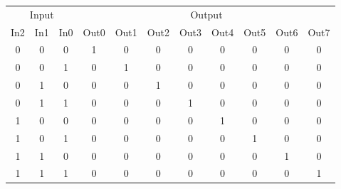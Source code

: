 \documentclass{standalone}
\begin{document}
	\begin{tabular}{ccc|cccccccc}
		\multicolumn{3}{c|}{Input} & \multicolumn{8}{c}{Output} \\
		In2 & In1 & In0 & Out0 & Out1 & Out2 & Out3 & Out4 & Out5 & Out6 & Out7 \\ \hline
		0 & 0 & 0 & 1 & 0 & 0 & 0 & 0 & 0 & 0 & 0 \\
		0 & 0 & 1 & 0 & 1 & 0 & 0 & 0 & 0 & 0 & 0 \\
		0 & 1 & 0 & 0 & 0 & 1 & 0 & 0 & 0 & 0 & 0 \\
		0 & 1 & 1 & 0 & 0 & 0 & 1 & 0 & 0 & 0 & 0 \\
		1 & 0 & 0 & 0 & 0 & 0 & 0 & 1 & 0 & 0 & 0 \\
		1 & 0 & 1 & 0 & 0 & 0 & 0 & 0 & 1 & 0 & 0 \\
		1 & 1 & 0 & 0 & 0 & 0 & 0 & 0 & 0 & 1 & 0 \\
		1 & 1 & 1 & 0 & 0 & 0 & 0 & 0 & 0 & 0 & 1 \\
	\end{tabular}
\end{document}
